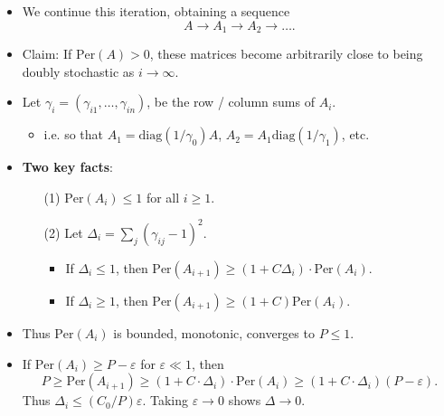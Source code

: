 \documentclass[usenames,dvipsnames,12pt]{beamer}
\begin{document}
\begin{frame}
    \begin{itemize}
        \item We continue this iteration, obtaining a sequence
        \[ A \to A_1 \to A_2 \to \dots. \]

        \pause
        \item Claim: If $\text{Per}(A) > 0$, these matrices become arbitrarily close to being doubly stochastic as $i \to \infty$.

        \pause
        \item Let $\gamma_i = (\gamma_{i1}, \dots, \gamma_{in})$, be the row / column sums of $A_i$.

        \begin{itemize}
            \pause
            \item i.e. so that $A_1 = \text{diag}(1/\gamma_0) A$, $A_2 = A_1 \text{diag}(1/\gamma_1)$, etc.
        \end{itemize}

        \pause
        \item {\bf Two key facts}:
        \begin{itemize}
            \pause
            \item[(1)] $\text{Per}(A_i) \leq 1$ for all $i \geq 1$.
            \pause
            \item[(2)] Let $\Delta_i = \sum_j (\gamma_{ij} - 1)^2$.
            \begin{itemize}
                \pause
                \item If $\Delta_i \leq 1$, then $\text{Per}(A_{i+1}) \geq (1 + C \Delta_i) \cdot \text{Per}(A_i)$.

                \item If $\Delta_i \geq 1$, then $\text{Per}(A_{i+1}) \geq (1 + C) \text{Per}(A_i)$.
            \end{itemize}
        \end{itemize}

        \pause
        \item Thus $\text{Per}(A_i)$ is bounded, monotonic, converges to $P \leq 1$.

        \pause
        \item If $\text{Per}(A_i) \geq P - \varepsilon$ for $\varepsilon \ll 1$, then
        \[ P \geq \text{Per}(A_{i+1}) \geq (1 + C \cdot \Delta_i) \cdot \text{Per}(A_i) \geq (1 + C \cdot \Delta_i)(P - \varepsilon). \]
        Thus $\Delta_i \leq (C_0/P) \varepsilon$. Taking $\varepsilon \to 0$ shows $\Delta \to 0$.
    \end{itemize}
\end{frame}
\end{document}
